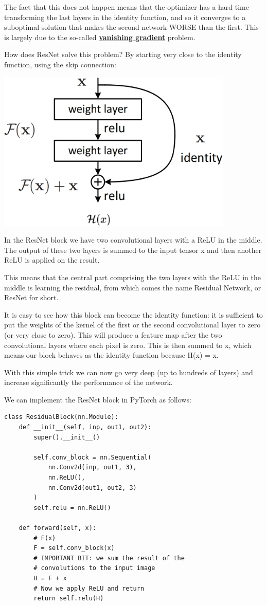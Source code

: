 The fact that this does not happen means that the optimizer has a hard time transforming the last layers in the identity function, and so it converges to a suboptimal solution that makes the second network WORSE than the first. This is largely due to the so-called \href{http://neuralnetworksanddeeplearning.com/chap5.html}{\textbf{vanishing gradient}} problem.\newline

How does ResNet solve this problem? By starting very close to the identity function, using the skip connection:

\includegraphics[width=0.5\linewidth]{img//cnn//transfer/skip-connection.jpeg}

In the ResNet block we have two convolutional layers with a ReLU in the middle. The output of these two layers is summed to the input tensor x and then another ReLU is applied on the result.\newline

This means that the central part comprising the two layers with the ReLU in the middle is learning the residual, from which comes the name Residual Network, or ResNet for short.\newline

It is easy to see how this block can become the identity function: it is sufficient to put the weights of the kernel of the first or the second convolutional layer to zero (or very close to zero). This will produce a feature map after the two convolutional layers where each pixel is zero. This is then summed to x, which means our block behaves as the identity function because H(x) = x.\newline

With this simple trick we can now go very deep (up to hundreds of layers) and increase significantly the performance of the network.\newline

We can implement the ResNet block in PyTorch as follows:
\begin{lstlisting}
class ResidualBlock(nn.Module):
    def __init__(self, inp, out1, out2):
        super().__init__()

        self.conv_block = nn.Sequential(
            nn.Conv2d(inp, out1, 3),
            nn.ReLU(),
            nn.Conv2d(out1, out2, 3)
        )
        self.relu = nn.ReLU()

    def forward(self, x):
        # F(x)
        F = self.conv_block(x)
        # IMPORTANT BIT: we sum the result of the
        # convolutions to the input image
        H = F + x
        # Now we apply ReLU and return
        return self.relu(H)
\end{lstlisting}

